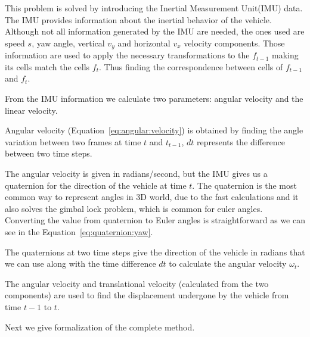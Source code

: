 This problem is solved by introducing the Inertial Measurement Unit(IMU) data. The IMU provides information about the inertial behavior of the vehicle. Although not all information generated by the IMU are needed, the ones used are speed $s$, yaw angle, vertical $v_y$ and horizontal $v_x$ velocity components. Those information are used to apply the necessary transformations to the $f_{t-1}$ making its cells match the cells $f_{t}$. Thus finding the correspondence between cells of $f_{t-1}$ and $f_{t}$.

From the IMU information we calculate two parameters: angular velocity and the linear velocity. 

Angular velocity (Equation~\ref{eq:angular:velocity}) is obtained by finding the angle variation between two frames at time $t$ and $t_{t-1}$, $dt$ represents the difference between two time steps.

The angular velocity is given in radians/second, but the IMU gives us a quaternion for the direction of the vehicle at time $t$. The quaternion is the most common way to represent angles in 3D world, due to the fast calculations and it also solves the gimbal lock problem, which is common for euler angles. Converting the value from quaternion to Euler angles is straightforward as we can see in the Equation~\ref{eq:quaternion:yaw}.

The quaternions at two time steps give the direction of the vehicle in radians that we can use along with the time difference $dt$ to calculate the angular velocity $\omega_t$.

The angular velocity and translational velocity (calculated from the two components) are used to find the displacement undergone by the vehicle from time $t-1$ to $t$.



Next we give formalization of the complete method.

